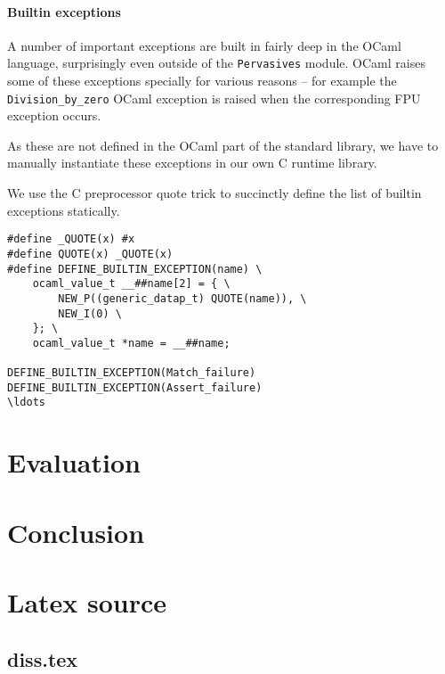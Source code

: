 \documentclass[12pt,a4paper,twoside,openright]{report}
\begin{document}
\subsubsection{Builtin exceptions}

A number of important exceptions are built in fairly deep in the OCaml language, surprisingly even outside of the \lstinline!Pervasives! module. OCaml raises some of these exceptions specially for various reasons -- for example the \lstinline!Division_by_zero! OCaml exception is raised when the corresponding FPU exception occurs.

As these are not defined in the OCaml part of the standard library, we have to manually instantiate these exceptions in our own C runtime library.

We use the C preprocessor quote trick to succinctly define the list of builtin exceptions statically.

\begin{lstlisting}
#define _QUOTE(x) #x
#define QUOTE(x) _QUOTE(x)
#define DEFINE_BUILTIN_EXCEPTION(name) \
    ocaml_value_t __##name[2] = { \
        NEW_P((generic_datap_t) QUOTE(name)), \
        NEW_I(0) \
    }; \
    ocaml_value_t *name = __##name;

DEFINE_BUILTIN_EXCEPTION(Match_failure)
DEFINE_BUILTIN_EXCEPTION(Assert_failure)
\ldots
\end{lstlisting}

\chapter{Evaluation}


\chapter{Conclusion}





\appendix

\chapter{Latex source}

\section{diss.tex}
{\scriptsize}
\end{document}
